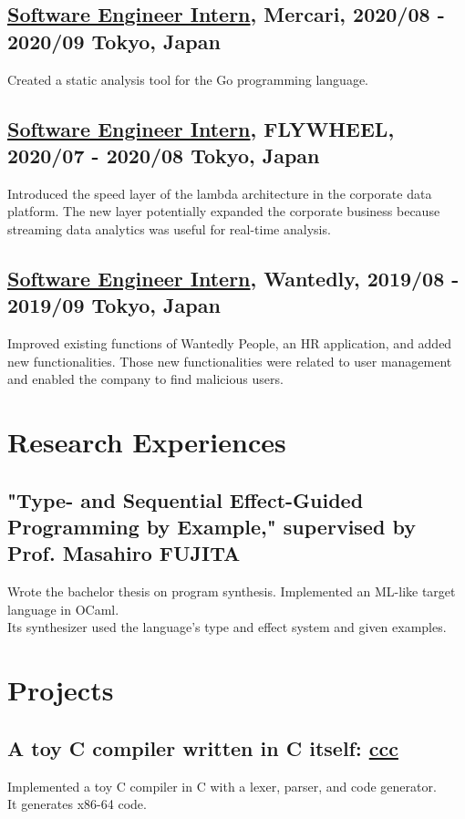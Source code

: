 \documentclass[10pt]{article}
\begin{document}
  \subsection*{\underline{Software Engineer Intern}, Mercari, 2020/08 - 2020/09 \hfill Tokyo, Japan}
    Created a static analysis tool for the Go programming language.
  \subsection*{\underline{Software Engineer Intern}, FLYWHEEL, 2020/07 - 2020/08 \hfill Tokyo, Japan}
    Introduced the speed layer of the lambda architecture in the corporate data platform.
    The new layer potentially expanded the corporate business because streaming data analytics was useful for real-time analysis.
  \subsection*{\underline{Software Engineer Intern}, Wantedly, 2019/08 - 2019/09 \hfill Tokyo, Japan}
    Improved existing functions of Wantedly People, an HR application, and added new functionalities.
    Those new functionalities were related to user management and enabled the company to find malicious users.

\section*{Research Experiences}
  \subsection*{"Type- and Sequential Effect-Guided Programming by Example," supervised by Prof. Masahiro FUJITA}
    Wrote the bachelor thesis on program synthesis.
    Implemented an ML-like target language in OCaml.
    \\
    Its synthesizer used the language's type and effect system and given examples.

\section*{Projects}
  \subsection*{A toy C compiler written in C itself: \href{https://github.com/diohabara/ccc}{ccc}}
    Implemented a toy C compiler in C with a lexer, parser, and code generator.
    \\
    It generates x86-64 code.
\end{document}
